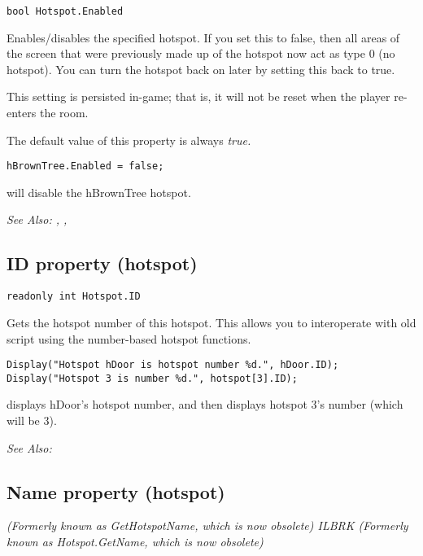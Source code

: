 \begin{verbatim}
bool Hotspot.Enabled
\end{verbatim}
Enables/disables the specified hotspot. If you set this to false, then all areas of the screen
that were previously made up of the hotspot now act as type 0 (no hotspot). You can turn the
hotspot back on later by setting this back to true.

This setting is persisted in-game; that is, it will not be reset when the player
re-enters the room.

The default value of this property is always \it{true}.

\begin{verbatim}
hBrownTree.Enabled = false;
\end{verbatim}
will disable the hBrownTree hotspot.

\it{See Also:} ,
,


\subsection{ID property (hotspot)}\label{Hotspot.ID}%

\begin{verbatim}
readonly int Hotspot.ID
\end{verbatim}
Gets the hotspot number of this hotspot. This allows you to interoperate with old
script using the number-based hotspot functions.

\begin{verbatim}
Display("Hotspot hDoor is hotspot number %d.", hDoor.ID);
Display("Hotspot 3 is number %d.", hotspot[3].ID);
\end{verbatim}
displays hDoor's hotspot number, and then displays hotspot 3's number (which will be 3).

\it{See Also:} 


\subsection{Name property (hotspot)}\label{Hotspot.Name}%

\it{(Formerly known as GetHotspotName, which is now obsolete)} ILBRK
\it{(Formerly known as Hotspot.GetName, which is now obsolete)}

